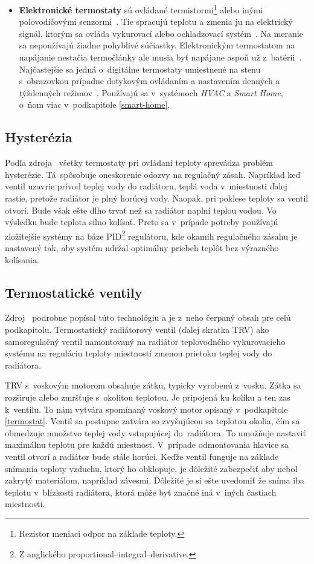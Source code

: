 \begin{itemize}
\item \textbf{Elektronické termostaty} sú ovládané termistormi\footnote{Rezistor meniaci odpor na základe teploty.} alebo inými polovodičovými senzormi~\cite{challi_heating_2020}. 
Tie spracujú teplotu a zmenia ju na elektrický signál, ktorým sa ovláda vykurovací alebo ochladzovací systém~\cite{challi_heating_2020,robinson_2022}. 
Na meranie sa nepoužívajú žiadne pohyblivé súčiastky. 
Elektronickým termostatom na napájanie nestačia termočlánky ale musia byť napájane aspoň už z~batérii~\cite{robinson_2022}. 
Najčastejšie sa jedná o~digitálne termostaty umiestnené na stenu s~obrazovkou prípadne dotykovým ovládaním a nastavením denných a týždenných režimov~\cite{robinson_2022}. 
Používajú sa v~systémoch \emph{HVAC} a \emph{Smart Home}, o~ňom viac v~podkapitole \ref{smart-home}.
\end{itemize}

\subsection{Hysterézia}\label{Hyster}
Podľa zdroja~\cite{cadence_2022} všetky termostaty pri ovládaní teploty sprevádza problém hysterézie. 
Tá~spôsobuje oneskorenie odozvy na regulačný zásah. 
Napríklad keď ventil uzavrie prívod teplej vody do radiátoru, teplá voda v~miestnosti ďalej rastie, pretože radiátor je plný horúcej vody. 
Naopak, pri poklese teploty sa ventil otvorí. Bude však ešte dlho trvať než sa radiátor naplní teplou vodou. Vo výsledku bude teplota silno kolísať. 
Preto sa v~prípade potreby používajú zložitejšie systémy na báze PID\footnote{Z anglického proportional–integral–derivative.} regulátoru, kde okamih regulačného zásahu je nastavený tak, aby systém udržal optimálny priebeh teplôt bez výrazného kolísania.

\subsection{Termostatické ventily}\label{TRV}
Zdroj~\cite{castrads_2022} podrobne popísal túto technológiu a je z~neho čerpaný obsah pre celú podkapitolu.
Termostatický radiátorový ventil (ďalej skratka TRV) ako samoregulačný ventil namontovaný na radiátor teplovodného vykurovacieho systému na reguláciu teploty miestností zmenou prietoku teplej vody do radiátora.

TRV s~voskovým motorom obsahuje zátku, typicky vyrobenú z~vosku. 
Zátka sa rozširuje alebo zmršťuje s~okolitou teplotou. 
Je pripojená ku kolíku a ten zas k~ventilu. 
To nám vytvára spomínaný voskový motor opísaný v~podkapitole \ref{termostat}. 
Ventil sa postupne zatvára so zvyšujúcou sa teplotou okolia, čím sa obmedzuje množstvo teplej vody vstupujúcej do~radiátora. To umožňuje nastaviť maximálnu teplotu pre každú miestnosť. V~prípade odmontovania hlavice sa ventil otvorí a radiátor bude stále horúci.
Keďže ventil funguje na základe snímania teploty vzduchu, ktorý ho obklopuje, je dôležité zabezpečiť aby nebol zakrytý materiálom, napríklad závesmi.
Dôležité je si ešte uvedomiť že sníma iba teplotu v~blízkosti radiátora, ktorá môže byť značné iná v~iných častiach miestnosti.

